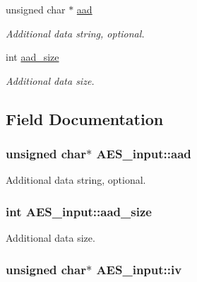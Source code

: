 \begin{DoxyCompactItemize}
unsigned char $\ast$ \hyperlink{struct_a_e_s__input_a08f558421e1323b98792916b58247809}{aad}
\begin{DoxyCompactList}\small\item\em Additional data string, optional. \end{DoxyCompactList}\item 
int \hyperlink{struct_a_e_s__input_a5279e1da29a10104d2704077962ddda1}{aad\+\_\+size}
\begin{DoxyCompactList}\small\item\em Additional data size. \end{DoxyCompactList}\end{DoxyCompactItemize}


\subsection{Field Documentation}
\hypertarget{struct_a_e_s__input_a08f558421e1323b98792916b58247809}{
\subsubsection[{aad}]{\setlength{\rightskip}{0pt plus 5cm}unsigned char$\ast$ A\+E\+S\+\_\+input\+::aad}}\label{struct_a_e_s__input_a08f558421e1323b98792916b58247809}


Additional data string, optional. 

\hypertarget{struct_a_e_s__input_a5279e1da29a10104d2704077962ddda1}{
\subsubsection[{aad\+\_\+size}]{\setlength{\rightskip}{0pt plus 5cm}int A\+E\+S\+\_\+input\+::aad\+\_\+size}}\label{struct_a_e_s__input_a5279e1da29a10104d2704077962ddda1}


Additional data size. 

\hypertarget{struct_a_e_s__input_aab44e297cbbd902f78c8c9ca3e54d414}{
\subsubsection[{iv}]{\setlength{\rightskip}{0pt plus 5cm}unsigned char$\ast$ A\+E\+S\+\_\+input\+::iv}}\label{struct_a_e_s__input_aab44e297cbbd902f78c8c9ca3e54d414}


